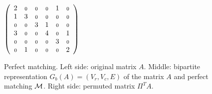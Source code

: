 \begin{figure}
\begin{minipage}{.32\textwidth}
\begin{center}
    $\left(
        \begin{array}{cccccc}
        2 &  \scriptstyle{0}  & \scriptstyle{0} & \scriptstyle{0} & 1 & \scriptstyle{0} \\
         1 & 3 & \scriptstyle{0} &  \scriptstyle{0} & \scriptstyle{0} & \scriptstyle{0} \\
        \scriptstyle{0} & \scriptstyle{0} &  3  & 1 & \scriptstyle{0} & \scriptstyle{0} \\
         3  & \scriptstyle{0} & \scriptstyle{0} & 4 & \scriptstyle{0} & 1 \\
        \scriptstyle{0} & \scriptstyle{0} & \scriptstyle{0} & \scriptstyle{0} &  3  & \scriptstyle{0} \\
        \scriptstyle{0} & 1 & \scriptstyle{0} & \scriptstyle{0} & \scriptstyle{0} &  2
        \end{array}
    \right) $ 
 \end{center}  
\end{minipage}
    \caption{Perfect matching. Left side: original
      matrix $A$. Middle: bipartite representation $G_b(A) = (V_r, V_c, E)$
      of the matrix $A$ and perfect matching $\mathcal{M}$. Right side: permuted matrix
      $\Pi^TA$.}
    \label{fig:unsym_perm}
\end{figure}


